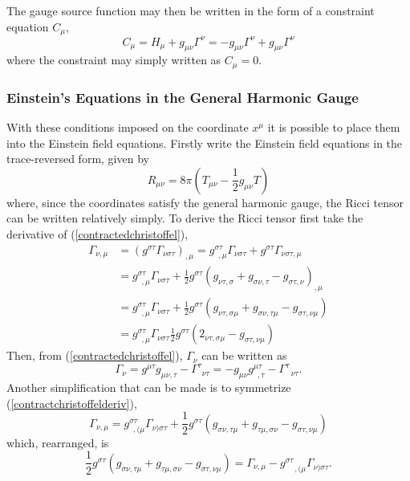\documentclass[11pt]{article}
\newcommand{\blank}{\enspace}
\newcommand{\blankt}{\text{ }}
\numberwithin{equation}{section}
\begin{document}
The gauge source function may then be written in the form of a constraint equation $C_{\mu}$,
\begin{equation}
    C_{\mu} = H_{\mu} + g_{\mu\nu}\Gamma^{\nu} = -g_{\mu\nu}\Gamma^{\nu} + g_{\mu\nu}\Gamma^{\nu}
\end{equation}
where the constraint may simply written as $C_{\mu} = 0$. 

\subsubsection{Einstein's Equations in the General Harmonic Gauge}
With these conditions imposed on the coordinate $x^{\mu}$ it is possible to place them into the Einstein field equations. Firstly write the Einstein field equations in the trace-reversed form, given by
\begin{equation}\label{tracereversedEFE}
    R_{\mu\nu} = 8\pi(T_{\mu\nu} - \frac12g_{\mu\nu}T)
\end{equation}
where, since the coordinates satisfy the general harmonic gauge, the Ricci tensor can be written relatively simply. To derive the Ricci tensor first take the derivative of (\ref{contractedchristoffel}),
\begin{equation}\label{contractchristoffelderiv}
\begin{split}
    \Gamma_{\nu,\mu} &= (g^{\sigma\tau}\Gamma_{\nu\sigma\tau})_{,\mu} = g^{\sigma\tau}_{\blank,\mu}\Gamma_{\nu\sigma\tau} + g^{\sigma\tau}\Gamma_{\nu\sigma\tau,\mu} \\
    &= g^{\sigma\tau}_{\blank,\mu}\Gamma_{\nu\sigma\tau} + \frac12g^{\sigma\tau}(g_{\nu\tau,\sigma} + g_{\sigma\nu,\tau} - g_{\sigma\tau,\nu})_{,\mu} \\
    &= g^{\sigma\tau}_{\blank,\mu}\Gamma_{\nu\sigma\tau} + \frac12g^{\sigma\tau}(g_{\nu\tau,\sigma\mu} + g_{\sigma\nu,\tau\mu} - g_{\sigma\tau,\nu\mu}) \\ 
    &= g^{\sigma\tau}_{\blank,\mu}\Gamma_{\nu\sigma\tau} \frac12g^{\sigma\tau}(2_{\nu\tau,\sigma\mu} - g_{\sigma\tau,\nu\mu}) 
\end{split}
\end{equation}
Then, from (\ref{contractedchristoffel}), $\Gamma_{\nu}$ can be written as 
\begin{equation} \label{loweredcontractedchristoffel}
    \Gamma_{\nu} = g^{\mu\tau}g_{\mu\nu,\tau} - \Gamma^{\tau}_{\blank\nu\tau} = -g_{\mu\nu}g^{\mu\tau}_{\blank,\tau} - \Gamma^{\tau}_{\blankt\nu\tau}.
\end{equation}
Another simplification that can be made is to symmetrize (\ref{contractchristoffelderiv}),
\begin{equation}\label{symmetrizedcontractedgamma}
    \Gamma_{\nu,\mu} = g^{\sigma\tau}_{\blank,(\mu}\Gamma^{\phantom{\sigma\tau}}_{\nu)\sigma\tau} + \frac12 g^{\sigma\tau}(g_{\sigma\nu,\tau\mu} + g_{\tau\mu,\sigma\nu} - g_{\sigma\tau,\nu\mu})
\end{equation}
which, rearranged, is
\begin{equation}
    \frac12 g^{\sigma\tau}(g_{\sigma\nu,\tau\mu} + g_{\tau\mu,\sigma\nu} - g_{\sigma\tau,\nu\mu}) = \Gamma_{\nu,\mu} - g^{\sigma\tau}_{\blank\blankt,(\mu}\Gamma^{\phantom{\sigma\tau}}_{\nu)\sigma\tau}.
\end{equation}
\end{document}
